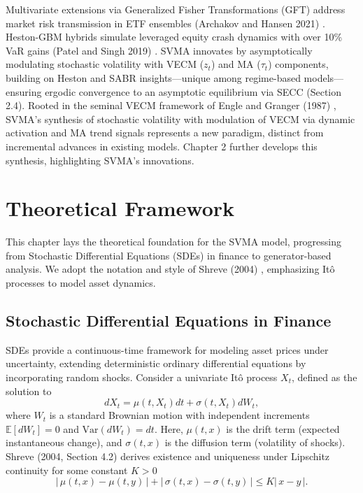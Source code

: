 \documentclass[12pt]{report}
\begin{document}
\vspace{0.2in}

Multivariate extensions via Generalized Fisher Transformations (GFT) address market risk transmission in ETF ensembles (Archakov and Hansen 2021) \cite{archakov2021multivariate}. Heston-GBM hybrids simulate leveraged equity crash dynamics with over 10\% VaR gains (Patel and Singh 2019) \cite{medium2019stochastic}. SVMA innovates by asymptotically modulating stochastic volatility with VECM (\(z_t\)) and MA (\(\tau_t\)) components, building on Heston and SABR insights—unique among regime-based models—ensuring ergodic convergence to an asymptotic equilibrium via SECC (Section 2.4). Rooted in the seminal VECM framework of Engle and Granger (1987) \cite{engle1987cointegration}, SVMA’s synthesis of stochastic volatility with modulation of VECM via dynamic activation and MA trend signals represents a new paradigm, distinct from incremental advances in existing models. Chapter 2 further develops this synthesis, highlighting SVMA’s innovations.

\chapter{Theoretical Framework}

This chapter lays the theoretical foundation for the SVMA model, progressing from Stochastic Differential Equations (SDEs) in finance to generator-based analysis. We adopt the notation and style of Shreve (2004) \cite{shreve2004}, emphasizing Itô processes to model asset dynamics.
\section{Stochastic Differential Equations in Finance}
SDEs provide a continuous-time framework for modeling asset prices under uncertainty, extending deterministic ordinary differential equations by incorporating random shocks. Consider a univariate Itô process \(X_t\), defined as the solution to
\[
    dX_t = \mu(t, X_t) dt + \sigma(t, X_t) dW_t,
\]
where \(W_t\) is a standard Brownian motion with independent increments \(\mathbb{E}[dW_t] = 0\) and \(\text{Var}(dW_t) = dt\). Here, \(\mu(t, x)\) is the drift term (expected instantaneous change), and \(\sigma(t, x)\) is the diffusion term (volatility of shocks). Shreve (2004, Section 4.2) \cite{shreve2004} derives existence and uniqueness under Lipschitz continuity for some constant \(K > 0\)
\[
    |\,\mu(t, x) - \mu(t, y)\,| + |\,\sigma(t, x) - \sigma(t, y)\,| \leq K |\,x - y\,|.
\]
\end{document}
